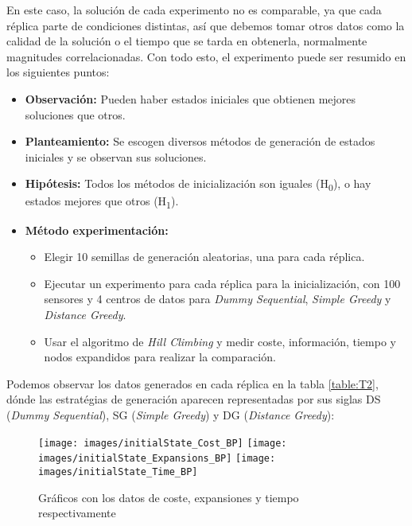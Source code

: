 \documentclass{article}
\begin{document}
\begin{enumerate}
  En este caso, la solución de cada experimento no es comparable, ya que cada réplica parte de condiciones distintas, así que debemos tomar otros datos como la calidad de la solución o el tiempo que se tarda en obtenerla, normalmente magnitudes correlacionadas. Con todo esto, el experimento puede ser resumido en los siguientes puntos:
  \begin{itemize}
    \item \textbf{Observación:} Pueden haber estados iniciales que obtienen mejores soluciones que otros.
    \item \textbf{Planteamiento:} Se escogen diversos métodos de generación de estados iniciales y se observan sus soluciones.
    \item \textbf{Hipótesis:} Todos los métodos de inicialización son iguales (H\textsubscript{0}), o hay estados mejores que otros (H\textsubscript{1}).
    \item \textbf{Método experimentación:} \begin{itemize}
        \item Elegir 10 semillas de generación aleatorias, una para cada réplica.
        \item Ejecutar un experimento para cada réplica para la inicialización, con 100 sensores y 4 centros de datos para \textit{Dummy Sequential}, \textit{Simple Greedy} y \textit{Distance Greedy}.
        \item Usar el algoritmo de \textit{Hill Climbing} y medir coste, información, tiempo y nodos expandidos para realizar la comparación.
    \end{itemize}
  \end{itemize}

  Podemos observar los datos generados en cada réplica en la tabla \ref{table:T2}, dónde las estratégias de generación aparecen representadas por sus siglas DS (\textit{Dummy Sequential}), SG (\textit{Simple Greedy}) y DG (\textit{Distance Greedy}):

  \begin{figure}[htp]
    \centering
    \texttt{[image: images/initialState\_Cost\_BP]}\hfill
    \texttt{[image: images/initialState\_Expansions\_BP]}\hfill
    \texttt{[image: images/initialState\_Time\_BP]}
    \caption{Gráficos con los datos de coste, expansiones y tiempo respectivamente}
    \label{fig:BP2}
  \end{figure}


\end{enumerate}
\end{document}
